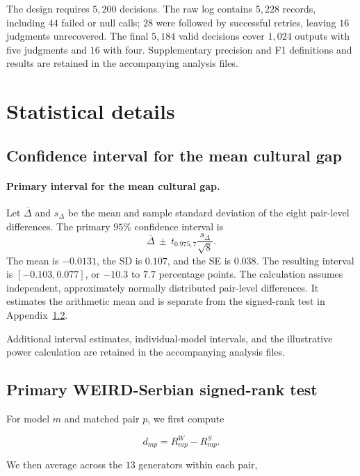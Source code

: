 \documentclass[11pt,a4paper]{article}
\begin{document}
The design requires $5{,}200$ decisions. The raw log contains $5{,}228$ records, including $44$ failed or null calls; $28$ were followed by successful retries, leaving $16$ judgments unrecovered. The final $5{,}184$ valid decisions cover $1{,}024$ outputs with five judgments and $16$ with four. Supplementary precision and F1 definitions and results are retained in the accompanying analysis files.

\section{Statistical details}
\label{app:statistics}

\subsection{Confidence interval for the mean cultural gap}
\label{app:bootstrap}

\paragraph{Primary interval for the mean cultural gap.}
Let $\overline\Delta$ and $s_\Delta$ be the mean and sample standard deviation of the eight pair-level differences. The primary $95\%$ confidence interval is
\[
\overline\Delta\ \pm\ t_{0.975,7}\frac{s_\Delta}{\sqrt{8}}.
\]
The mean is $-0.0131$, the SD is $0.107$, and the SE is $0.038$. The resulting interval is $[-0.103,0.077]$, or $-10.3$ to $7.7$ percentage points. The calculation assumes independent, approximately normally distributed pair-level differences. It estimates the arithmetic mean and is separate from the signed-rank test in Appendix~\ref{app:primary_wilcoxon}.

Additional interval estimates, individual-model intervals, and the illustrative power calculation are retained in the accompanying analysis files.

\subsection{Primary WEIRD-Serbian signed-rank test}
\label{app:primary_wilcoxon}

For model $m$ and matched pair $p$, we first compute

\begin{equation}
 d_{mp}=R^W_{mp}-R^S_{mp}.
\end{equation}

We then average across the $13$ generators within each pair,
\end{document}
